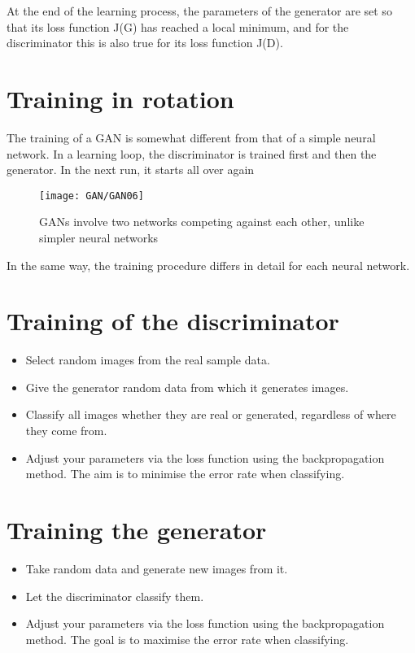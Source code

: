 At the end of the learning process, the parameters of the generator are set so that its loss function J(G) has reached a local minimum, and for the discriminator this is also true for its loss function J(D).

\section{Training in rotation}

The training of a GAN is somewhat different from that of a simple neural network. In a learning loop, the discriminator is trained first and then the generator. In the next run, it starts all over again


\begin{figure}
  \texttt{[image: GAN/GAN06]}
  \caption{GANs involve two networks competing against each other, unlike simpler neural networks} 
  \label{GAN06}
\end{figure}

In the same way, the training procedure differs in detail for each neural network.



\section{Training of the discriminator}

\begin{itemize}
  \item Select random images from the real sample data.
  \item Give the generator random data from which it generates images.
  \item Classify all images whether they are real or generated, regardless of where they come from.
  \item Adjust your parameters via the loss function using the backpropagation method. The aim is to minimise the error rate when classifying.
\end{itemize}


\section{Training the generator}

\begin{itemize}
  \item Take random data and generate new images from it.
  \item Let the discriminator classify them.
  \item Adjust your parameters via the loss function using the backpropagation method. The goal is to maximise the error rate when classifying.
\end{itemize}

